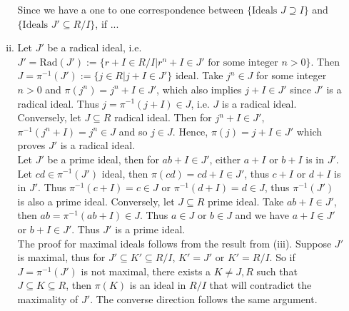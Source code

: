 \documentclass[a4paper,10pt]{article}
\theoremstyle{definition}
\begin{document}
\begin{enumerate}[1.]
\begin{enumerate}[(i)]
Since we have a one to one correspondence between $\{\text{Ideals }J \supseteq I\}$ and $\{\text{Ideals }J' \subseteq R/I\}$, if ...

\item Let $J'$ be a radical ideal, i.e. $J' = \text{Rad}(J'):=\{r +I\in R/I | r^n+I \in J' \text{ for some integer } n > 0\}$. Then $J = \pi^{-1}(J'):=\{j \in R | j+I \in J'\}$ ideal. Take $j^n \in J$ for some integer $n>0$ and $\pi(j^n) = j^n+ I \in J'$, which also implies $j +I \in J'$ since $J'$ is a radical ideal. Thus $j = \pi^{-1}(j+I) \in J$, i.e. $J$ is a radical ideal. Conversely, let $J\subseteq R$ radical ideal. Then for $j^n+I \in J'$, $\pi^{-1}(j^n+I) = j^n \in J$ and so $j \in J$. Hence, $\pi(j) = j+I \in J'$ which proves $J'$ is a radical ideal.
\\
Let $J'$ be a prime ideal, then for $ab+I\in J'$, either $a+I$ or $b+I$ is in $J'$. Let $cd \in \pi^{-1}(J')$ ideal, then $\pi(cd) = cd +I \in J'$, thus $c +I$ or $d+I$ is in $J'$. Thus $\pi^{-1}(c +I) = c \in J$ or $\pi^{-1}(d +I) = d \in J$, thus $\pi^{-1}(J')$ is also a prime ideal. Conversely, let $J\subseteq R$ prime ideal. Take $ab+I\in J'$, then $ab = \pi^{-1}(ab+I) \in J$. Thus $a \in J$ or $b \in J$ and we have $a+I \in J'$ or $b+I \in J'$. Thus $J'$ is a prime ideal.
\\The proof for maximal ideals follows from the result from (iii). Suppose $J'$ is maximal, thus for $J'\subseteq K' \subseteq R/I$, $K' = J'$ or $K' = R/I$. So if $J = \pi^{-1}(J')$ is not maximal, there exists a $K \neq J, R$ such that $J \subseteq K \subseteq R$, then $\pi(K)$ is an ideal in $R/I$ that will contradict the maximality of $J'$. The converse direction follows the same argument.
\end{enumerate}


\end{enumerate}
\end{document}
